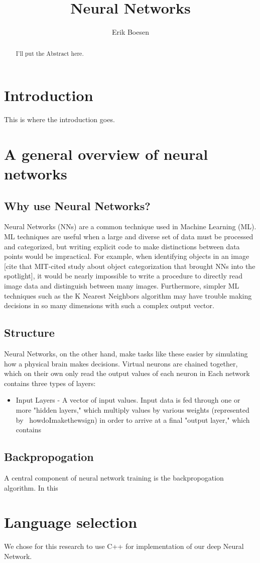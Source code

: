 \documentclass{article}
\begin{document}
\title{Neural Networks}
\author{Erik Boesen}

\maketitle

\begin{abstract}
I'll put the Abstract here.
\end{abstract}

\section{Introduction}
This is where the introduction goes.

\section{A general overview of neural networks}
\subsection{Why use Neural Networks?}
Neural Networks (NNs) are a common technique used in Machine Learning (ML). ML techniques are useful when a large and diverse set of data must be processed and categorized, but writing explicit code to make distinctions between data points would be impractical. For example, when identifying objects in an image [cite that MIT-cited study about object categorization that brought NNs into the spotlight], it would be nearly impossible to write a procedure to directly read image data and distinguish between many images. Furthermore, simpler ML  techniques such as the K Nearest Neighbors algorithm may have trouble making decisions in so many dimensions with such a complex output vector.

\subsection{Structure}
Neural Networks, on the other hand, make tasks like these easier by simulating how a physical brain makes decisions. Virtual neurons are chained together, which on their own only read the output values of each neuron in  Each network contains three types of layers:
\begin{itemize}
\item{Input Layers} - A vector of input values. Input data is fed through one or more "hidden layers," which multiply values by various weights (represented by \ howdoImakethewsign) in order to arrive at a final "output layer," which contains 
\end{itemize}

\subsection{Backpropogation}
A central component of neural network training is the backpropogation algorithm. In this 

\section{Language selection}
We chose for this research to use C++ for implementation of our deep Neural Network.
\end{document}
